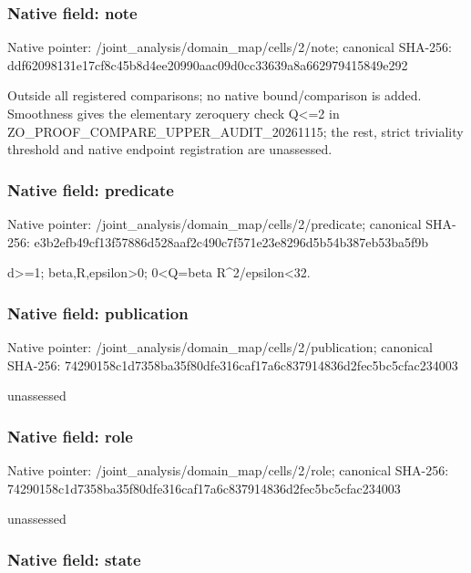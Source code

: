 \documentclass[10pt,a4paper]{article}
\begin{document}
\subsubsection{Native field: note}


Native pointer: /joint\_analysis/domain\_map/cells/2/note; canonical SHA-256: ddf62098131e17cf8c45b8d4\allowbreak{}ee20990aac09d0cc33639a8a\allowbreak{}662979415849e292


Outside all registered comparisons; no native bound/comparison is added. Smoothness gives the elementary zeroquery check Q<=2 in ZO\_PROOF\_COMPARE\_UPPER\_AUDIT\_20261115; the rest, strict triviality threshold and native endpoint registration are unassessed.


\subsubsection{Native field: predicate}


Native pointer: /joint\_analysis/domain\_m\allowbreak{}ap/cells/2/predicate; canonical SHA-256: e3b2efb49cf13f57886d528a\allowbreak{}af2c490c7f571e23e8296d5b\allowbreak{}54b387eb53ba5f9b


d>=1; beta,R,epsilon>0; 0<Q=beta R\textasciicircum{}2/epsilon<32.


\subsubsection{Native field: publication}


Native pointer: /joint\_analysis/domain\_m\allowbreak{}ap/cells/2/publication; canonical SHA-256: 74290158c1d7358ba35f80df\allowbreak{}e316caf17a6c837914836d2f\allowbreak{}ec5bc5cfac234003


unassessed


\subsubsection{Native field: role}


Native pointer: /joint\_analysis/domain\_map/cells/2/role; canonical SHA-256: 74290158c1d7358ba35f80df\allowbreak{}e316caf17a6c837914836d2f\allowbreak{}ec5bc5cfac234003


unassessed


\subsubsection{Native field: state}
\end{document}
